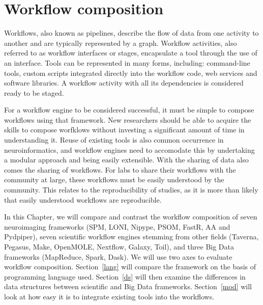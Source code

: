 \documentclass{report}
\newcommand{\tristan}[1]{\textcolor{red}{TG: #1}}
\begin{document}
    \chapter{Workflow composition}\label{workcomp}

        Workflows, also known as pipelines, describe the flow of data from one 
        activity to another and are typically represented by a graph. Workflow activities, also referred to as 
        workflow interfaces or stages, encapsulate a tool through the 
        use of an interface. Tools can be represented in many forms, 
        including: command-line tools, custom scripts integrated 
        directly into the workflow code, web services and software 
        libraries. A workflow activity with all its 
        dependencies is considered ready to be staged.

        For a workflow engine to be considered successful, it must be simple to 
        compose workflows using that framework. New researchers should be able 
        to acquire the skills to compose worfklows without
        investing a significant amount of time in understanding it. Reuse of
        existing tools is also common occurrence in neuroinformatics, and 
        workflow engines need to accomodate this by undertaking a modular 
        approach and being easily extensible. With the sharing of data also 
        comes the sharing of workflows. For labs to share their workflows with
        the community at large, these workflows must be easily understood by the
        community. This relates to the reproducibility of studies, as it is 
        more than likely that easily understood workflows are reproducible. 

        In this Chapter, we will compare and contrast the workflow composition 
        of seven neuroimaging frameworks (SPM, LONI, Nipype, PSOM, FastR, AA and
        Pydpiper), seven scientific workflow engines stemming from other fields
        (Taverna, Pegasus, Make, OpenMOLE, Nextflow, Galaxy, Toil), and three
        Big Data frameworks (MapReduce, Spark, Dask). We will use two axes to
        evaluate workflow composition. Section~\ref{lang} will compare the 
        framework on the basis of programming language used. Section~\ref{ds}
        will then examine the differences in data structures between scientific
        and Big Data frameworks. 
        Section~\ref{mod} will look at how easy it is to integrate existing 
        tools into the workflows.
\end{document}
